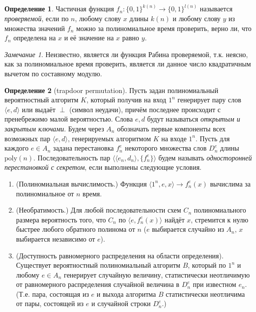 \documentclass[12pt]{article}
\newcommand{\poly}{\mathrm{poly}}
\theoremstyle{definition}
\newtheorem{definition}{Определение}[section]
\theoremstyle{plain}
\theoremstyle{remark}
\newtheorem{remark}{Замечание}[section]
\begin{document}
\begin{definition}
Частичная функция $f_n:\{0,1\}^{k(n)}\to \{0,1\}^{l(n)}$ называется
\emph{проверяемой}, если по $n$, любому слову $x$ длины $k(n)$
и любому слову $y$ из множества значений $f_n$ можно 
за полиномиальное время проверить, верно ли, что $f_n$
определена на $x$ и её значение на $x$ равно $y$.
\end{definition}
\begin{remark}
Неизвестно, является ли функция Рабина проверяемой, т.к. неясно, как за полиномиальное время проверить, является
ли данное число квадратичным вычетом по составному модулю.
\end{remark}

\begin{definition}[trapdoor permutation]
Пусть задан полиномиальный вероятностный алгоритм $K$,
который получив на вход $1^n$ генерирует пару слов 
$\langle e, d \rangle$ или выдаёт $\perp$ (символ неудачи),
причём последнее происходит с пренебрежимо малой вероятностью.
Слова $e,d$ будут называться \emph{открытым и закрытым ключами}. Будем через $A_n$ обозначать первые компоненты
всех возможных пар $\langle e,d\rangle$, генерируемых
алгоритмом $K$ на входе $1^n$. Пусть для каждого $e\in A_n$
задана перестановка $f_n^e$ некоторого множества слов $D_n^e$
длины $\poly(n)$. Последовательность пар 
$\langle\langle e_n, d_n\rangle,\{f_n^e\} \rangle$
будем называть \emph{односторонней перестановкой с секретом},
если выполнены следующие условия.
\begin{enumerate}
\item (Полиномиальная вычислимость.) Функция 
$\langle 1^n, e,x \rangle\to f_n^e(x)$ вычислима
за полиномиальное от $n$ время.
\item (Необратимость.) Для любой последовательности
схем $C_n$ полиномиального размера вероятность того,
что $C_n$ по $\langle e,f_n^e(x) \rangle$ найдёт $x$,
стремится к нулю быстрее любого обратного полинома от $n$
($e$ выбирается случайно из $A_n$, 
$x$ выбирается независимо от $e$).
\item (Доступность равномерного распределения на области определения).
Существует вероятностный полиномиальный алгоритм $B$,
который по $1^n$ и любому $e\in A_n$ генерирует случайную
величину, статистически неотличимую от равномерного 
распределения случайной величина в $D_n^e$ при известном $e_n$.
(Т.е. пара, состоящая из $e$ и выхода алгоритма $B$
статистически неотличима от пары, состоящей из $e$ и 
случайной строки $D_n^e$.)


\end{enumerate}
\end{definition}
\end{document}
